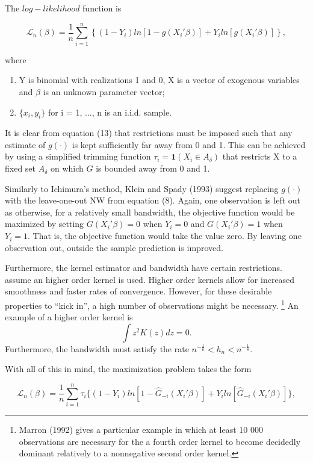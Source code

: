\documentclass[a4paper]{article}
\begin{document}
The $log-likelihood$ function is

\begin{equation}
\mathcal{L}_n(\beta) = \frac{1}{n}\sum_{i=1}^n \left\{ (1 - Y_i)ln[ 1 - g(X_i'\beta)] + Y_iln[g(X_i'\beta)] \right\},
\end{equation}

where

\begin{enumerate}[label=(\roman*)]
		\item Y is binomial with realizations 1 and 0, X is a vector of exogenous variables and $\beta$ is an unknown parameter vector;
		\item $\{x_i,y_i\}$ for i = 1, ..., n is an i.i.d. sample.
\end{enumerate}

It is clear from equation (13) that restrictions must be imposed such that any estimate of $g(\cdot)$ is kept sufficiently far away from 0 and 1. This can be achieved by using a simplified trimming function $\tau_i = \mathbf{1}{(X_i \in A_\delta)}$ that restricts X to a fixed set $A_\delta$ on which $G$ is bounded away from 0 and 1.

Similarly to Ichimura's method, Klein and Spady (1993) suggest replacing $g(\cdot)$ with the leave-one-out NW from equation (8). Again, one observation is left out as otherwise, for a relatively small bandwidth, the objective function would be maximized by setting $G(X_i'\beta)=0$ when $Y_i=0$ and $G(X_i'\beta)=1$ when $Y_i=1$. That is, the objective function would take the value zero. By leaving one observation out, outside the sample prediction is improved. 

Furthermore, the kernel estimator and bandwidth have certain restrictions. assume an higher order kernel is used. Higher order kernels allow for increased smoothness and faster rates of convergence. However, for these desirable properties to ``kick in'', a high number of observations might be necessary. \footnote{Marron (1992) gives a particular example in which at least 10 000 observations are necessary for the a fourth order kernel to become decidedly dominant relatively to a nonnegative second order kernel.} An example of a higher order kernel is
\[\int z^{2}K(z)dz = 0.\]
Furthermore, the bandwidth must satisfy the rate $ n^{-\frac{1}{6}} < h_n < n^{-\frac{1}{8}}$.

With all of this in mind, the maximization problem takes the form

\begin{equation}
\mathcal{L}_n(\beta) = \frac{1}{n}\sum_{i=1}^n \tau_{i}\{ (1 - Y_i)ln[ 1 - \hat{G}_{-i}(X_i'\beta)] +  Y_iln[\hat{G}_{-i}(X_i'\beta)]\},
\end{equation}
\end{document}
